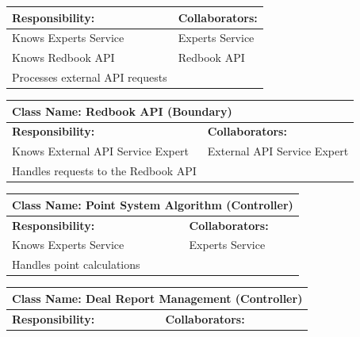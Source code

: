 \documentclass[]{article}
\begin{document}
\begin{itemize}
\begin{table}[H]
\begin{tabular}{|p{6cm}|p{6cm}|}
            \hline
            \textbf{Responsibility:} & \textbf{Collaborators:} \\
            \hline
            Knows Experts Service & Experts Service \\
            Knows Redbook API & Redbook API \\
            Processes external API requests & \\
            \hline
            \end{tabular}
        \end{table}  
        \begin{table}[H]
            \centering
            \begin{tabular}{|p{6cm}|p{6cm}|}
            \hline 
             \multicolumn{2}{|l|}{\textbf{Class Name: Redbook API (Boundary)}} \\
            \hline
            \textbf{Responsibility:} & \textbf{Collaborators:} \\
            \hline
            Knows External API Service Expert & External API Service Expert \\
            Handles requests to the Redbook API & \\
            \hline
            \end{tabular}
        \end{table}
        \begin{table}[H]
            \centering
            \begin{tabular}{|p{6cm}|p{6cm}|}
            \hline 
             \multicolumn{2}{|l|}{\textbf{Class Name: Point System Algorithm (Controller)}} \\
            \hline
            \textbf{Responsibility:} & \textbf{Collaborators:} \\
            \hline
            Knows Experts Service & Experts Service \\
            Handles point calculations & \\
            \hline
            \end{tabular}
        \end{table}
        \begin{table}[H]
            \centering
            \begin{tabular}{|p{6cm}|p{6cm}|}
            \hline 
             \multicolumn{2}{|l|}{\textbf{Class Name: Deal Report Management (Controller)}} \\
            \hline
            \textbf{Responsibility:} & \textbf{Collaborators:} \\

\end{tabular}
\end{table}
\end{itemize}
\end{document}
